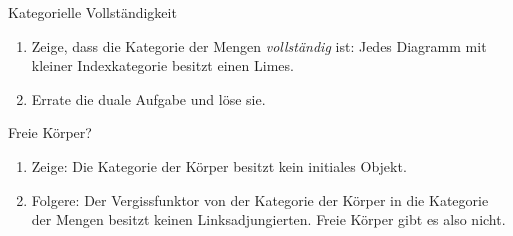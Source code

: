 \documentclass{uebblatt}
\begin{document}
\begin{aufgabe}{Kategorielle Vollständigkeit}
\begin{enumerate}
\item Zeige, dass die Kategorie der Mengen \emph{vollständig} ist: Jedes Diagramm
mit kleiner Indexkategorie besitzt einen Limes.
\item Errate die duale Aufgabe und löse sie.
\end{enumerate}
\end{aufgabe}

\begin{aufgabe}{Freie Körper?}
\begin{enumerate}
\item Zeige: Die Kategorie der Körper besitzt kein initiales Objekt.
\item Folgere: Der Vergissfunktor von der Kategorie der Körper in die Kategorie
der Mengen besitzt keinen Linksadjungierten. Freie Körper gibt es also nicht.
\end{enumerate}
\end{aufgabe}
\end{document}

